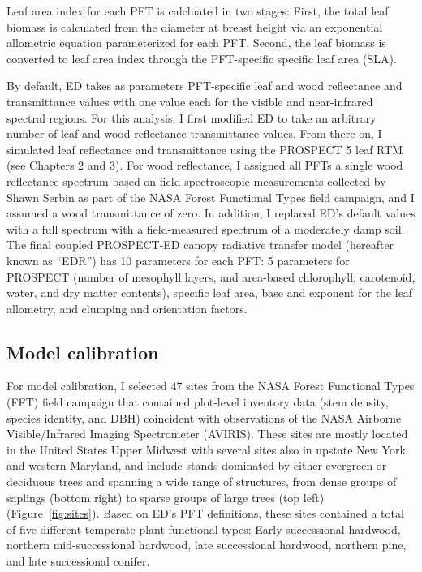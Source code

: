 Leaf area index for each PFT is calcluated in two stages:
First, the total leaf biomass is calculated from the diameter at breast height via an exponential allometric equation parameterized for each PFT\@.
% 
% 
Second, the leaf biomass is converted to leaf area index through the PFT-specific specific leaf area (SLA).

By default, ED takes as parameters PFT-specific leaf and wood reflectance and transmittance values with one value each for the visible and near-infrared spectral regions. 
For this analysis, I first modified ED to take an arbitrary number of leaf and wood reflectance transmittance values.
From there on, I simulated leaf reflectance and transmittance using the PROSPECT 5 leaf RTM (see Chapters 2 and 3).
For wood reflectance, I assigned all PFTs a single wood reflectance spectrum based on field spectroscopic measurements collected by Shawn Serbin as part of the NASA Forest Functional Types field campaign, and I assumed a wood transmittance of zero.  %
In addition, I replaced ED's default values with a full spectrum with a field-measured spectrum of a moderately damp soil.
The final coupled PROSPECT-ED canopy radiative transfer model (hereafter known as ``EDR'') has 10 parameters for each PFT\@:
5 parameters for PROSPECT (number of mesophyll layers, and area-based chlorophyll, carotenoid, water, and dry matter contents),
specific leaf area,
base and exponent for the leaf allometry,
and clumping and orientation factors.

\subsection{Model calibration}

For model calibration, I selected 47 sites from the NASA Forest Functional Types (FFT) field campaign that contained plot-level inventory data (stem density, species identity, and DBH) coincident with observations of the NASA Airborne Visible/Infrared Imaging Spectrometer (AVIRIS).
These sites are mostly located in the United States Upper Midwest with several sites also in upstate New York and western Maryland, and include stands dominated by either evergreen or deciduous trees and spanning a wide range of structures, from dense groups of saplings (bottom right) to sparse groups of large trees (top left) (Figure~\ref{fig:sites}).
Based on ED's PFT definitions, these sites contained a total of five different temperate plant functional types: Early successional hardwood, northern mid-successional hardwood, late successional hardwood, northern pine, and late successional conifer.

